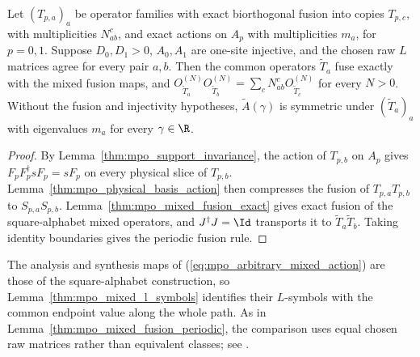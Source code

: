 \begin{lemma}
    \label{thm:mpo_arbitrary_mixed_fusion}
    \leanok
    Let $(T_{p,a})_a$ be operator families with exact biorthogonal fusion
    into copies $T_{p,c}$, with multiplicities $N_{ab}^c$, and exact
    actions on $A_p$ with multiplicities $m_a$, for $p=0,1$. Suppose
    $D_0,D_1>0$, $A_0,A_1$ are one-site injective, and the chosen raw
    $L$ matrices agree for every pair $a,b$. Then the common operators
    $\widetilde T_a$ fuse exactly with the mixed fusion maps, and
    $O^{(N)}_{\widetilde T_a}O^{(N)}_{\widetilde T_b}
        =\sum_cN_{ab}^cO^{(N)}_{\widetilde T_c}$ for every $N>0$.
    Without the fusion and injectivity hypotheses, $\widetilde A(\gamma)$
    is symmetric under $(\widetilde T_a)_a$ with eigenvalues $m_a$ for
    every $\gamma\in\R$.
\end{lemma}
\begin{proof}
    \leanok
    By Lemma~\ref{thm:mpo_support_invariance}, the action of $T_{p,b}$
    on $A_p$ gives $F_pF_p^\dagger sF_p=sF_p$ on every physical slice
    of $T_{p,b}$. Lemma~\ref{thm:mpo_physical_basis_action} then
    compresses the fusion of $T_{p,a}T_{p,b}$ to $S_{p,a}S_{p,b}$.
    Lemma~\ref{thm:mpo_mixed_fusion_exact} gives exact fusion of the
    square-alphabet mixed operators, and $J^\dagger J=\Id$ transports it
    to $\widetilde T_a\widetilde T_b$. Taking identity boundaries gives
    the periodic fusion rule.
\end{proof}

The analysis and synthesis maps of
(\ref{eq:mpo_arbitrary_mixed_action}) are those of the square-alphabet
construction, so Lemma~\ref{thm:mpo_mixed_l_symbols} identifies their
$L$-symbols with the common endpoint value along the whole path. As in
Lemma~\ref{thm:mpo_mixed_fusion_periodic}, the comparison uses equal
chosen raw matrices rather than equivalent classes; see
\cite{gap:glm23_multiplicity_l_indices}.

